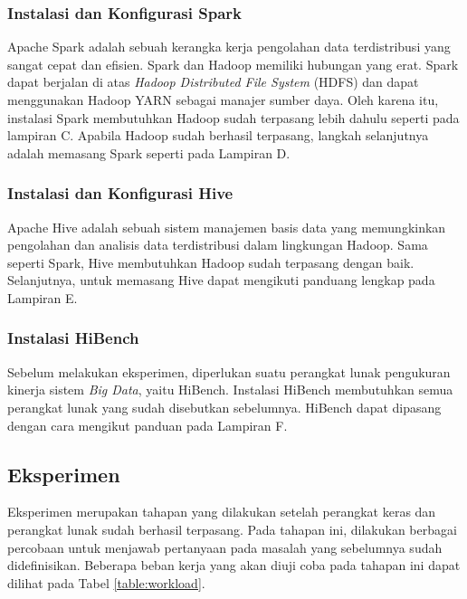 \subsubsection{Instalasi dan Konfigurasi Spark}
Apache Spark adalah sebuah kerangka kerja pengolahan data terdistribusi yang sangat cepat dan efisien. Spark dan Hadoop memiliki hubungan yang erat. Spark dapat berjalan di atas \textit{Hadoop Distributed File System} (HDFS) dan dapat menggunakan Hadoop YARN sebagai manajer sumber daya. Oleh karena itu, instalasi Spark membutuhkan Hadoop sudah terpasang lebih dahulu seperti pada lampiran C. Apabila Hadoop sudah berhasil terpasang, langkah selanjutnya adalah memasang Spark seperti pada Lampiran D.

\subsubsection{Instalasi dan Konfigurasi Hive}
Apache Hive adalah sebuah sistem manajemen basis data yang memungkinkan pengolahan dan analisis data terdistribusi dalam lingkungan Hadoop. Sama seperti Spark, Hive membutuhkan Hadoop sudah terpasang dengan baik. Selanjutnya, untuk memasang Hive dapat mengikuti panduang lengkap pada Lampiran E. 

\subsubsection{Instalasi HiBench}
Sebelum melakukan eksperimen, diperlukan suatu perangkat lunak pengukuran kinerja sistem \textit{Big Data}, yaitu HiBench. Instalasi HiBench membutuhkan semua perangkat lunak yang sudah disebutkan sebelumnya. HiBench dapat dipasang dengan cara mengikut panduan pada Lampiran F.

\subsection{Eksperimen}
Eksperimen merupakan tahapan yang dilakukan setelah perangkat keras dan perangkat lunak sudah berhasil terpasang. Pada tahapan ini, dilakukan berbagai percobaan untuk menjawab pertanyaan pada masalah yang sebelumnya sudah didefinisikan. Beberapa beban kerja yang akan diuji coba pada tahapan ini dapat dilihat pada Tabel \ref{table:workload}. 

